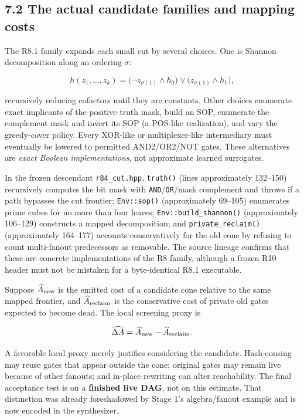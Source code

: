 \documentclass[a4paper,10pt]{article}
\theoremstyle{definition}
\theoremstyle{remark}
\begin{document}
\subsection{7.2 The actual candidate families and mapping costs}\label{the-actual-candidate-families-and-mapping-costs}

The R8.1 family expands each small cut by several choices. One is Shannon decomposition along an ordering \(\sigma\):

\[
h(z_1,\ldots,z_k)
=\bigl(\neg z_{\sigma(1)}\land h_0\bigr)
 \lor\bigl(z_{\sigma(1)}\land h_1\bigr),
\]

recursively reducing cofactors until they are constants. Other choices enumerate exact implicants of the positive truth mask, build an SOP, enumerate the complement mask and invert its SOP (a POS-like realization), and vary the greedy-cover policy. Every XOR-like or multiplexer-like intermediary must eventually be lowered to permitted AND2/OR2/NOT gates. These alternatives are \emph{exact Boolean implementations}, not approximate learned surrogates.

In the frozen descendant \texttt{r84\_cut.hpp}, \texttt{truth()} (lines approximately 132--150) recursively computes the bit mask with \texttt{AND}/\texttt{OR}/mask complement and throws if a path bypasses the cut frontier; \texttt{Env::sop()} (approximately 69--105) enumerates prime cubes for no more than four leaves; \texttt{Env::build\_shannon()} (approximately 106--129) constructs a mapped decomposition; and \texttt{private\_reclaim()} (approximately 164--177) accounts conservatively for the old cone by refusing to count multi-fanout predecessors as removable. The source lineage confirms that these are concrete implementations of the R8 family, although a frozen R10 header must not be mistaken for a byte-identical R8.1 executable.

Suppose \(\widehat A_{\rm new}\) is the emitted cost of a candidate cone relative to the same mapped frontier, and \(\widehat A_{\rm reclaim}\) is the conservative cost of private old gates expected to become dead. The local screening proxy is

\[
\widehat{\Delta A}=\widehat A_{\rm new}-\widehat A_{\rm reclaim}.
\]

A favorable local proxy merely justifies considering the candidate. Hash-consing may reuse gates that appear outside the cone; original gates may remain live because of other fanouts; and in-place rewriting can alter reachability. The final acceptance test is on a \textbf{finished live DAG}, not on this estimate. That distinction was already foreshadowed by Stage 1's algebra/fanout example and is now encoded in the synthesizer.
\end{document}
